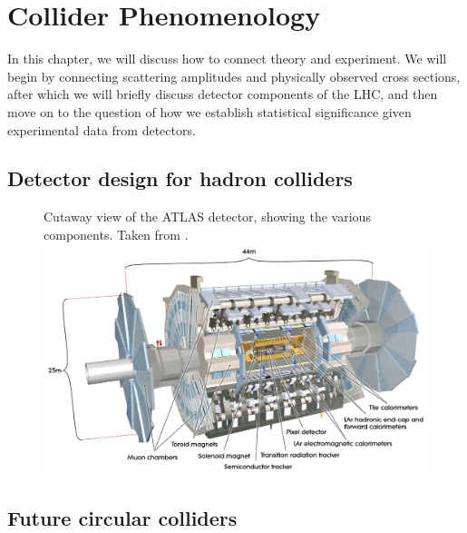 \chapter{Collider Phenomenology}
In this chapter, we will discuss how to connect theory and experiment. We will begin by connecting scattering amplitudes and physically observed cross sections, after which we will briefly discuss detector components of the LHC, and then move on to the question of how we establish statistical significance given experimental data from detectors.
\section{Detector design for hadron colliders}

\begin{figure}[h]
  \begin{sidecaption}
    { Cutaway view of the ATLAS detector, showing the various components. Taken from \citep{Atlas2008}.}
    \centering
  \includegraphics[trim = {2cm 5cm 2cm 2cm}, clip, width=1\textwidth]{images/atlas}
  \end{sidecaption}
\end{figure}

\section{Future circular colliders}

